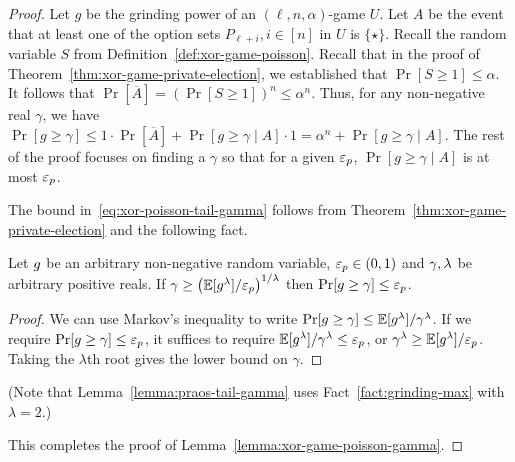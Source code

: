   \begin{proof}
      Let $g$ be the grinding power of an $(\ell, n, \alpha)$-game $U$.
      Let $A$ be the event that 
      at least one of the option sets $P_{\ell + i}, i \in [n]$ in $U$ is $\{\star\}$. 
      Recall the random variable $S$ from Definition~\ref{def:xor-game-poisson}. 
      Recall that in the proof of Theorem~\ref{thm:xor-game-private-election}, 
      we established that $\Pr[S \geq 1] \leq \alpha$. 
      It follows that $\Pr[\overline{A}] = (\Pr[S \geq 1])^n \leq \alpha^n$. 
      Thus, for any non-negative real $\gamma$, 
      we have 
      $
      \Pr[g \geq \gamma] 
      \leq 1 \cdot \Pr[\overline{A}] + \Pr[g \geq \gamma \mid A] \cdot 1
      = \alpha^n + \Pr[g \geq \gamma \mid A]
      $. 
      The rest of the proof focuses on finding a $\gamma$ so that 
      for a given $\mathsf{\varepsilon}_p$, 
      $\Pr[g \geq \gamma \mid A]$ is at most $\mathsf{\varepsilon}_p$. 

      The bound in~\eqref{eq:xor-poisson-tail-gamma} follows from 
      Theorem~\ref{thm:xor-game-private-election} and the following fact.

      \begin{fact}\label{fact:grinding-max}
          Let $g$ be an arbitrary non-negative random variable, 
          $\mathsf{\varepsilon}_p \in (0, 1)$ and 
          $\gamma, \lambda$ be arbitrary positive reals. 
          If $
              \gamma \geq \left( \operatorname{\mathbb{E}}[g^\lambda]/\mathsf{\varepsilon}_p \right)^{1/\lambda}
          $
          then $\Pr[g \geq \gamma] \leq \mathsf{\varepsilon}_p$.    
      \end{fact}
      \begin{proof}
          We can use Markov's inequality to write 
          $
              \Pr[g \geq \gamma] \leq \operatorname{\mathbb{E}}[g^\lambda]/\gamma^\lambda
          $.
          If we require $\Pr[g \geq \gamma] \leq \mathsf{\varepsilon}_p$, 
          it suffices to require 
          $\operatorname{\mathbb{E}}[g^\lambda]/\gamma^\lambda \leq \mathsf{\varepsilon}_p$, or
          $\gamma^\lambda \geq \operatorname{\mathbb{E}}[g^\lambda]/\mathsf{\varepsilon}_p$. 
          Taking the $\lambda$th root gives the lower bound on $\gamma$.
      \end{proof}
      \noindent
      (Note that Lemma~\ref{lemma:praos-tail-gamma} uses Fact~\ref{fact:grinding-max} 
      with $\lambda = 2$.)

      This completes the proof of Lemma~\ref{lemma:xor-game-poisson-gamma}.
  \end{proof}
